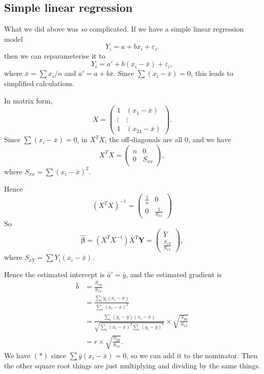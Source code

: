 \documentclass[a4paper]{article}
\begin{document}
\subsection{Simple linear regression}
What we did above was \emph{so} complicated. If we have a simple linear regression model
\[
  Y_i = a + bx_i + \varepsilon_i.
\]
then we can reparameterise it to
\[
  Y_i = a' + b(x_i - \bar x) + \varepsilon_i,\tag{6}
\]
where $\bar x = \sum x_i/n$ and $a' = a + b\bar x$. Since $\sum (x_i - \bar x) = 0$, this leads to simplified calculations.

In matrix form,
\[
  X =
  \begin{pmatrix}
    1 & (x_1 - \bar x)\\
    \vdots & \vdots \\
    1 & (x_{24} - \bar x)
  \end{pmatrix}.
\]
Since $\sum (x_i - \bar x) = 0$, in $X^TX$, the off-diagonals are all $0$, and we have
\[
  X^TX =
  \begin{pmatrix}
    n & 0\\
    0 & S_{xx}
  \end{pmatrix},
\]
where $S_{xx} = \sum (x_i - \bar x)^2$.

Hence
\[
  (X^TX)^{-1} =
  \begin{pmatrix}
    \frac{1}{n} & 0\\
    0 & \frac{1}{S_{xx}}
  \end{pmatrix}
\]
So
\[
  \hat{\boldsymbol\beta} = (X^TX^{-1})X^T \mathbf{Y} =
  \begin{pmatrix}
    \bar Y \\
    \frac{S_{xY}}{S_{xx}}
  \end{pmatrix},
\]
where $S_{xY} = \sum Y_i(x_i - \bar x)$.

Hence the estimated intercept is $\hat{a}' = \bar y$, and the estimated gradient is
\begin{align*}
  \hat{b} &= \frac{S_{xy}}{S_{xx}}\\
  &= \frac{\sum_i y_i(x_i - \bar x)}{\sum_i (x_i - \bar x)^2}\\
  &= \frac{\sum_i (y_i - \bar y)(x_i - \bar x)}{\sqrt{\sum_i (x_i - \bar x)^2\sum_i (y_i - \bar y)^2}}\times \sqrt{\frac{S_{yy}}{S_{xx}}}\tag{$*$}\\
  &= r \times \sqrt{\frac{S_{yy}}{S_{xx}}}.
\end{align*}
We have $(*)$ since $\sum \bar y(x_i - \bar x) = 0$, so we can add it to the nominator. Then the other square root things are just multiplying and dividing by the same things.
\end{document}
